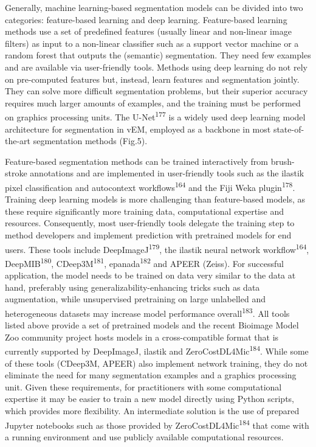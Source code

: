 \documentclass{article}
\begin{document}
Generally, machine learning-based segmentation models can be divided into two categories: feature-based learning and deep learning. Feature-based learning methods use a set of predefined features (usually linear and non-linear image filters) as input to a non-linear classifier such as a support vector machine or a random forest that outputs the (semantic) segmentation. They need few examples and are available via user-friendly tools. Methods using deep learning do not rely on pre-computed features but, instead, learn features and segmentation jointly. They can solve more difficult segmentation problems, but their superior accuracy requires much larger amounts of examples, and the training must be performed on graphics processing units. The U-Net\textsuperscript{177} is a widely used deep learning model architecture for segmentation in vEM, employed as a backbone in most state-of-the-art segmentation methods (Fig.5).

Feature-based segmentation methods can be trained interactively from brush-stroke annotations and are implemented in user-friendly tools such as the ilastik pixel classification and autocontext workflows\textsuperscript{164} and the Fiji Weka plugin\textsuperscript{178}. Training deep learning models is more challenging than feature-based models, as these require significantly more training data, computational expertise and resources. Consequently, most user-friendly tools delegate the training step to method developers and implement prediction with pretrained models for end users. These tools include DeepImageJ\textsuperscript{179}, the ilastik neural network workflow\textsuperscript{164}, DeepMIB\textsuperscript{180}, CDeep3M\textsuperscript{181}, epanada\textsuperscript{182} and APEER (Zeiss). For successful application, the model needs to be trained on data very similar to the data at hand, preferably using generalizability-enhancing tricks such as data augmentation, while unsupervised pretraining on large unlabelled and heterogeneous datasets may increase model performance overall\textsuperscript{183}. All tools listed above provide a set of pretrained models and the recent Bioimage Model Zoo community project hosts models in a cross-compatible format that is currently supported by DeepImageJ, ilastik and ZeroCostDL4Mic\textsuperscript{184}. While some of these tools (CDeep3M, APEER) also implement network training, they do not eliminate the need for many segmentation examples and a graphics processing unit. Given these requirements, for practitioners with some computational expertise it may be easier to train a new model directly using Python scripts, which provides more flexibility. An intermediate solution is the use of prepared Jupyter notebooks such as those provided by ZeroCostDL4Mic\textsuperscript{184} that come with a running environment and use publicly available computational resources.
\end{document}
